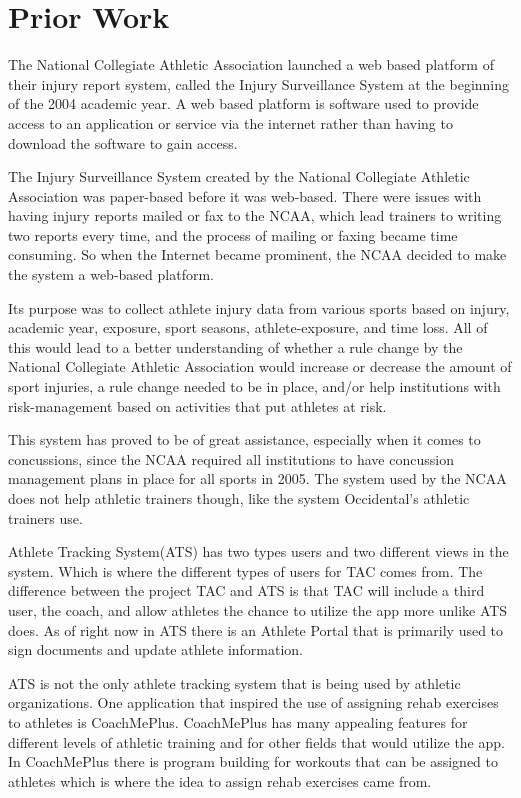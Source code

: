 \documentclass[10pt,twocolumn]{article}
\begin{document}
\section{Prior Work}
The National Collegiate Athletic Association launched a web based platform of their injury report system, called the Injury Surveillance System at the beginning of the 2004 academic year.\cite{ncaa} A web based platform is software used to provide access to an application or service via the internet rather than having to download the software to gain access.

The Injury Surveillance System created by the National Collegiate Athletic Association was paper-based before it was web-based. There were issues with having injury reports mailed or fax to the NCAA, which lead trainers to writing two reports every time, and the process of mailing or faxing became time consuming. So when the Internet became prominent, the NCAA decided to make the system a web-based platform. 

Its purpose was to collect athlete injury data from various sports based on injury, academic year, exposure, sport seasons, athlete-exposure, and time loss. All of this would lead to a better understanding of whether a rule change by the National Collegiate Athletic Association would increase or decrease the amount of sport injuries, a rule change needed to be in place, and/or help institutions with risk-management based on activities that put athletes at risk.

This system has proved to be of great assistance, especially when it comes to concussions, since the NCAA required all institutions to have concussion management plans in place for all sports in 2005.\cite{ncaa}
The system used by the NCAA does not help athletic trainers though, like the system Occidental's athletic trainers use.

Athlete Tracking System(ATS) has two types users and two different views in the system. Which is where the different types of users for TAC comes from. The difference between the project TAC and ATS is that TAC will include a third user, the coach, and allow athletes the chance to utilize the app more unlike ATS does. As of right now in ATS there is an Athlete Portal that is primarily used to sign documents and update athlete information. 

ATS is not the only athlete tracking system that is being used by athletic organizations. One application that inspired the use of assigning rehab exercises to athletes is CoachMePlus\cite{coachmeplus}. CoachMePlus has many appealing features for different levels of athletic training and for other fields that would utilize the app. In CoachMePlus there is program building for workouts that can be assigned to athletes which is where the idea to assign rehab exercises came from. 
\end{document}
